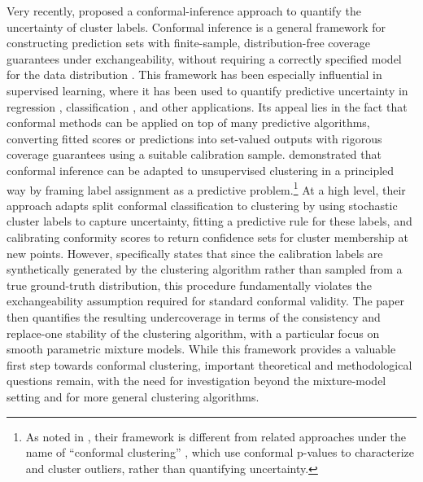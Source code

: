 \documentclass[11pt,letterpaper]{article}
\theoremstyle{definition}
\begin{document}
Very recently, \cite{hur2026inference} proposed a conformal-inference approach to quantify the uncertainty of cluster labels. Conformal inference is a general framework for constructing prediction sets with finite-sample, distribution-free coverage guarantees under exchangeability, without requiring a correctly specified model for the data distribution \cite{vovk2005algorithmic}. This framework has been especially influential in supervised learning, where it has been used to quantify predictive uncertainty in regression \cite{lei2018distribution,romano2019conformalized}, classification \cite{lei2014classification,sadinle2019least,romano2020classification}, and other applications. Its appeal lies in the fact that conformal methods can be applied on top of many predictive algorithms, converting fitted scores or predictions into set-valued outputs with rigorous coverage guarantees using a suitable calibration sample. \cite{hur2026inference} demonstrated that conformal inference can be adapted to unsupervised clustering in a principled way by framing label assignment as a predictive problem.\footnote{As noted in \cite{hur2026inference}, their framework is different from related approaches under the name of ``conformal clustering'' \cite{cherubin2015conformal,nouretdinov2020multi,kiani2020conformalized}, which use conformal p-values \cite{bates2023testing,liang2024integrative,lee2025full} to characterize and cluster outliers, rather than quantifying uncertainty.} At a high level, their approach adapts split conformal classification to clustering by using stochastic cluster labels to capture uncertainty, fitting a predictive rule for these labels, and calibrating conformity scores to return confidence sets for cluster membership at new points. However, \cite{hur2026inference} specifically states that since the calibration labels are synthetically generated by the clustering algorithm rather than sampled from a true ground-truth distribution, this procedure fundamentally violates the exchangeability assumption required for standard conformal validity. The paper then quantifies the resulting undercoverage in terms of the consistency and replace-one stability of the clustering algorithm, with a particular focus on smooth parametric mixture models. While this framework provides a valuable first step towards conformal clustering, important theoretical and methodological questions remain, with the need for investigation beyond the mixture-model setting and for more general clustering algorithms. 
\end{document}
